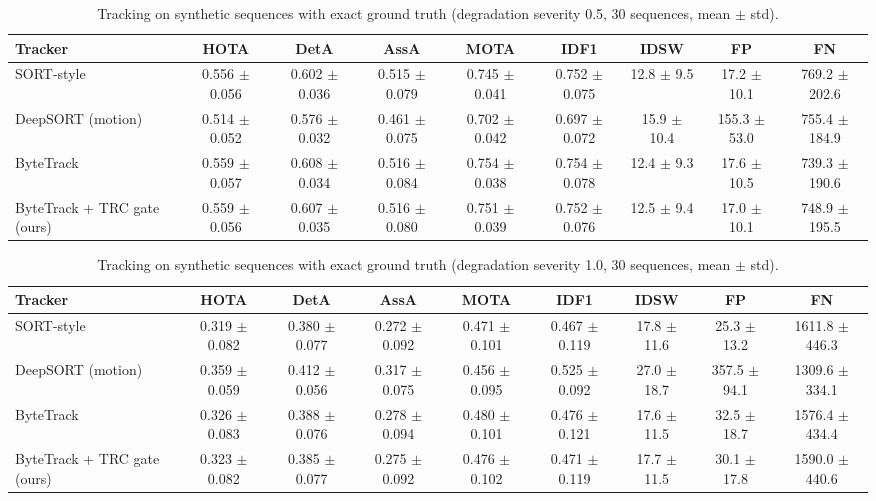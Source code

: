 \begin{table}[t]
\centering
\caption{Tracking on synthetic sequences with exact ground truth (degradation severity 0.5, 30 sequences, mean $\pm$ std).}
\label{tab:synth_sev05}
\begin{tabular}{lcccccccc}
\toprule
Tracker & HOTA & DetA & AssA & MOTA & IDF1 & IDSW & FP & FN \\
\midrule
SORT-style & 0.556 $\pm$ 0.056 & 0.602 $\pm$ 0.036 & 0.515 $\pm$ 0.079 & 0.745 $\pm$ 0.041 & 0.752 $\pm$ 0.075 & 12.8 $\pm$ 9.5 & 17.2 $\pm$ 10.1 & 769.2 $\pm$ 202.6 \\
DeepSORT (motion) & 0.514 $\pm$ 0.052 & 0.576 $\pm$ 0.032 & 0.461 $\pm$ 0.075 & 0.702 $\pm$ 0.042 & 0.697 $\pm$ 0.072 & 15.9 $\pm$ 10.4 & 155.3 $\pm$ 53.0 & 755.4 $\pm$ 184.9 \\
ByteTrack & 0.559 $\pm$ 0.057 & 0.608 $\pm$ 0.034 & 0.516 $\pm$ 0.084 & 0.754 $\pm$ 0.038 & 0.754 $\pm$ 0.078 & 12.4 $\pm$ 9.3 & 17.6 $\pm$ 10.5 & 739.3 $\pm$ 190.6 \\
ByteTrack + TRC gate (ours) & 0.559 $\pm$ 0.056 & 0.607 $\pm$ 0.035 & 0.516 $\pm$ 0.080 & 0.751 $\pm$ 0.039 & 0.752 $\pm$ 0.076 & 12.5 $\pm$ 9.4 & 17.0 $\pm$ 10.1 & 748.9 $\pm$ 195.5 \\
\bottomrule
\end{tabular}
\end{table}

\begin{table}[t]
\centering
\caption{Tracking on synthetic sequences with exact ground truth (degradation severity 1.0, 30 sequences, mean $\pm$ std).}
\label{tab:synth_sev10}
\begin{tabular}{lcccccccc}
\toprule
Tracker & HOTA & DetA & AssA & MOTA & IDF1 & IDSW & FP & FN \\
\midrule
SORT-style & 0.319 $\pm$ 0.082 & 0.380 $\pm$ 0.077 & 0.272 $\pm$ 0.092 & 0.471 $\pm$ 0.101 & 0.467 $\pm$ 0.119 & 17.8 $\pm$ 11.6 & 25.3 $\pm$ 13.2 & 1611.8 $\pm$ 446.3 \\
DeepSORT (motion) & 0.359 $\pm$ 0.059 & 0.412 $\pm$ 0.056 & 0.317 $\pm$ 0.075 & 0.456 $\pm$ 0.095 & 0.525 $\pm$ 0.092 & 27.0 $\pm$ 18.7 & 357.5 $\pm$ 94.1 & 1309.6 $\pm$ 334.1 \\
ByteTrack & 0.326 $\pm$ 0.083 & 0.388 $\pm$ 0.076 & 0.278 $\pm$ 0.094 & 0.480 $\pm$ 0.101 & 0.476 $\pm$ 0.121 & 17.6 $\pm$ 11.5 & 32.5 $\pm$ 18.7 & 1576.4 $\pm$ 434.4 \\
ByteTrack + TRC gate (ours) & 0.323 $\pm$ 0.082 & 0.385 $\pm$ 0.077 & 0.275 $\pm$ 0.092 & 0.476 $\pm$ 0.102 & 0.471 $\pm$ 0.119 & 17.7 $\pm$ 11.5 & 30.1 $\pm$ 17.8 & 1590.0 $\pm$ 440.6 \\
\bottomrule
\end{tabular}
\end{table}

